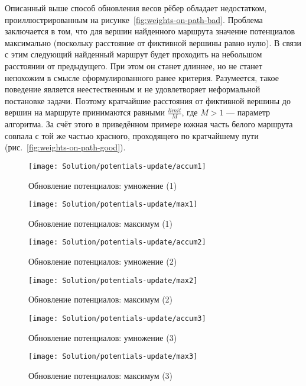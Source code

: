 Описанный выше способ обновления весов рёбер обладает недостатком,
проиллюстрированным на рисунке~\ref{fig:weights-on-path-bad}. Проблема
заключается в том, что для вершин найденного маршрута значение
потенциалов максимально (поскольку расстояние от фиктивной вершины
равно нулю). В связи с этим следующий найденный маршрут будет
проходить на небольшом расстоянии от предыдущего. При этом он станет
длиннее, но не станет непохожим в смысле сформулированного ранее
критерия. Разумеется, такое поведение является неестественным и не
удовлетворяет неформальной постановке задачи. Поэтому кратчайшие
расстояния от фиктивной вершины до вершин на маршруте принимаются
равными $\frac{limit}{M}$, где $M > 1$ --- параметр алгоритма. За счёт
этого в приведённом примере южная часть белого маршрута совпала с той
же частью красного, проходящего по кратчайшему пути
(рис.~\ref{fig:weights-on-path-good}).

\begin{figure}
    \texttt{[image: Solution/potentials-update/accum1]}
    \caption{Обновление потенциалов: умножение (1)}
    \label{fig:update-accum1}
\end{figure}

\begin{figure}
    \texttt{[image: Solution/potentials-update/max1]}
    \caption{Обновление потенциалов: максимум (1)}
    \label{fig:update-max1}
\end{figure}

\begin{figure}
    \texttt{[image: Solution/potentials-update/accum2]}
    \caption{Обновление потенциалов: умножение (2)}
    \label{fig:update-accum2}
\end{figure}

\begin{figure}
    \texttt{[image: Solution/potentials-update/max2]}
    \caption{Обновление потенциалов: максимум (2)}
    \label{fig:update-max2}
\end{figure}

\begin{figure}
    \texttt{[image: Solution/potentials-update/accum3]}
    \caption{Обновление потенциалов: умножение (3)}
    \label{fig:update-accum3}
\end{figure}

\begin{figure}
    \texttt{[image: Solution/potentials-update/max3]}
    \caption{Обновление потенциалов: максимум (3)}
    \label{fig:update-max3}
\end{figure}

